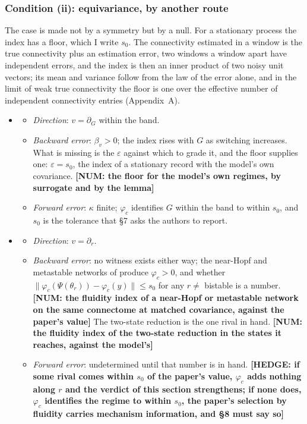 \documentclass[11pt]{article}
\newcommand{\NUM}[1]{\textcolor{red!70!black}{\textbf{[NUM: #1]}}}
\newcommand{\HEDGE}[1]{\textcolor{green!40!black}{\textbf{[HEDGE: #1]}}}
\begin{document}
\subsubsection{Condition (ii): equivariance, by another route}
The case is made not by a symmetry but by a null. For a stationary process the index has a floor, which I write $s_0$. The connectivity estimated in a window is the true connectivity plus an estimation error, two windows a window apart have independent errors, and the index is then an inner product of two noisy unit vectors; its mean and variance follow from the law of the error alone, and in the limit of weak true connectivity the floor is one over the effective number of independent connectivity entries (Appendix~A).
\begin{itemize}
\item[$\Theta_1$]
  \begin{itemize}
  \item \emph{Direction}: $v=\partial_G$ within the band.
  \item \emph{Backward error}: $\beta_v>0$; the index rises with $G$ as switching increases. What is missing is the $\varepsilon$ against which to grade it, and the floor supplies one: $\varepsilon=s_0$, the index of a stationary record with the model's own covariance. \NUM{the floor for the model's own regimes, by surrogate and by the lemma}
  \item \emph{Forward error}: $\kappa$ finite; $\varphi_c$ identifies $G$ within the band to within $s_0$, and $s_0$ is the tolerance that \S7 asks the authors to report.
  \end{itemize}
\item[$\Theta_2$]
  \begin{itemize}
  \item \emph{Direction}: $v=\partial_r$.
  \item \emph{Backward error}: no witness exists either way; the near-Hopf and metastable networks of \parencite{hansen2015,deco2017} produce $\varphi_c>0$, and whether $\|\varphi_c(\Psi(\theta_r))-\varphi_c(y)\|\le s_0$ for any $r\ne$ bistable is a number. \NUM{the fluidity index of a near-Hopf or metastable network on the same connectome at matched covariance, against the paper's value} The two-state reduction is the one rival in hand. \NUM{the fluidity index of the two-state reduction in the states it reaches, against the model's}
  \item \emph{Forward error}: undetermined until that number is in hand. \HEDGE{if some rival comes within $s_0$ of the paper's value, $\varphi_c$ adds nothing along $r$ and the verdict of this section strengthens; if none does, $\varphi_c$ identifies the regime to within $s_0$, the paper's selection by fluidity carries mechanism information, and \S8 must say so}

\end{itemize}
\end{itemize}
\end{document}
